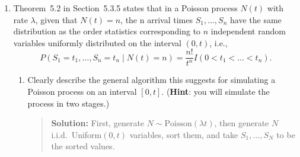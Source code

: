 \documentclass{article}
\def\Var{\mathop{\rm Var\,}\nolimits}
\def\Cov{\mathop{\rm Cov\,}\nolimits}
\begin{document}
\begin{enumerate}
\begin{enumerate}
  \item Find $\Cov (X_{(1)}, X_{(2)})$. ({\bf Hint:} What is $\Var[ X_{(1)} +
  X_{(2)} ]$?)
  \begin{quotation}{\bf Solution:}
  We know that $2\Cov(X_{(1)}, X_{(2)}) =  \Var[ X_{(1)} +  X_{(2)} ] - \Var X_{(1)}-
  \Var X_{(2)}$.
  Furthermore, $\Var [ X_{(1)} + X_{(2)} ]$ is simply $\Var X_1 + \Var X_2$ since $X_1$ and
  $X_2$ are independent and they have the same sum as $X_{(1)}$ and $X_{(2)}$.
  Thus,
  \[
  \Cov(X_{(1)}, X_{(2)}) = \frac12 \left( \frac{1}{\lambda_1^2} + \frac{1}{\lambda_2^2}
  - \frac{1}{(\lambda_1+\lambda_2)^2} - \Var X_{(2)}
  \right) = \frac{1}{(\lambda_1+\lambda_2)^2}.
  \]
  Actually, it is just as easy to find this covariance directly, since $E(X_{(1)}X_{(2)})=
  E(X_1X_2)=E(X_1)E(X_2)$:
  \[
  \Cov(X_{(1)}, X_{(2)}) = E(X_{(1)}X_{(2)}) - E(X_{(1)}) E (X_{(2)}) =
  \frac{1}{\lambda_1\lambda_2}
  - \frac{1}{\lambda_1+\lambda_2} \left( \frac{1}{\lambda_1} 
  + \frac{1}{\lambda_2} - \frac{1}{\lambda_1+\lambda_2} \right) =
  \frac{1}{(\lambda_1+\lambda_2)^2}.
  \]
  This also gives us a way to check that the answer for (b) is correct (!), since we could use
  this result as an alternative method of finding $\Var X_{(2)}$.
  \end{quotation}
  
  
  \end{enumerate}

\item Theorem~5.2 in Section~5.3.5 states that in a Poisson process $N(t)$ with
rate $\lambda$, given that $N(t)=n$, the n arrival times $S_1,\dots,S_n$ have
the same distribution as the order statistics corresponding to $n$ independent
random variables uniformly distributed on the interval $(0,t)$, i.e.,
$$P(S_1=t_1,\dots,S_n=t_n \mid N(t)=n)=\frac{n!}{t^n} I(0<t_1<\dots <t_n). $$

  \begin{enumerate}

  \item Clearly describe the general algorithm this suggests for simulating a
  Poisson process on an interval $[0,t]$. ({\bf Hint}: you will simulate the
  process in two stages.)
  \begin{quotation}{\bf Solution:}
  First, generate $N\sim\mbox{Poisson}(\lambda t)$, then generate $N$ i.i.d.~Uniform$(0, t)$
  variables, sort them, and take $S_1, \ldots, S_N$ to be the sorted values.
  \end{quotation}
  


\end{enumerate}
\end{enumerate}
\end{document}
